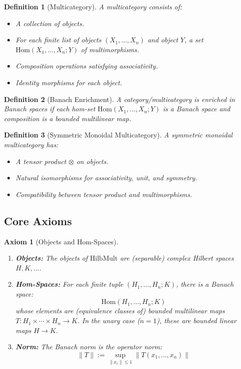 \documentclass[11pt]{article}
\newtheorem{definition}{Definition}
\newtheorem{axiom}{Axiom}
\begin{document}
\begin{definition}[Multicategory]
A multicategory consists of:
\begin{itemize}
    \item A collection of objects.
    \item For each finite list of objects $(X_1,\dots,X_n)$ and object $Y$, a set $\mathrm{Hom}(X_1,\dots,X_n;Y)$ of multimorphisms.
    \item Composition operations satisfying associativity.
    \item Identity morphisms for each object.
\end{itemize}
\end{definition}

\begin{definition}[Banach Enrichment]
A category/multicategory is enriched in Banach spaces if each hom-set $\mathrm{Hom}(X_1,\dots,X_n;Y)$ is a Banach space and composition is a bounded multilinear map.
\end{definition}

\begin{definition}[Symmetric Monoidal Multicategory]
A symmetric monoidal multicategory has:
\begin{itemize}
    \item A tensor product $\otimes$ on objects.
    \item Natural isomorphisms for associativity, unit, and symmetry.
    \item Compatibility between tensor product and multimorphisms.
\end{itemize}
\end{definition}

\subsection{Core Axioms}

\begin{axiom}[Objects and Hom-Spaces]\label{ax:H1-H2}
\begin{enumerate}[label=(\alph*)]
    \item \textbf{Objects:} The objects of $\mathrm{HilbMult}$ are (separable) complex Hilbert spaces $H, K, \dots$.
    
    \item \textbf{Hom-Spaces:} For each finite tuple $(H_1,\dots,H_n;K)$, there is a Banach space:
    \[
    \mathrm{Hom}(H_1,\dots,H_n;K)
    \]
    whose elements are (equivalence classes of) bounded multilinear maps $T: H_1\times\cdots\times H_n \to K$. In the unary case ($n=1$), these are bounded linear maps $H \to K$.
    
    \item \textbf{Norm:} The Banach norm is the operator norm:
    \[
    \|T\| := \sup_{\|x_i\|\le 1} \|T(x_1,\dots,x_n)\|
    \]
\end{enumerate}
\end{axiom}
\end{document}
